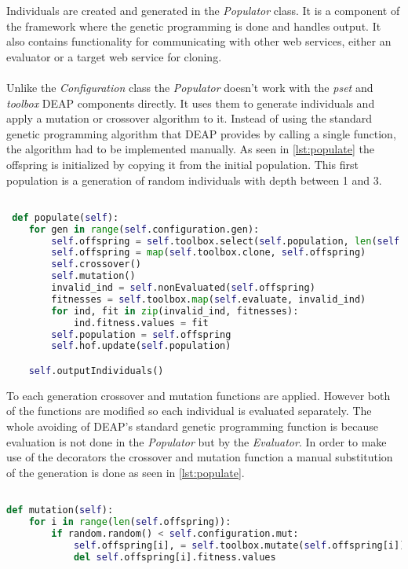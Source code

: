 Individuals are created and generated in the \textit{Populator} class. It is a component of the framework where
the genetic programming is done and handles output. It also contains functionality for communicating with other
web services, either an evaluator or a target web service for cloning.
\paragraph{}
Unlike the \textit{Configuration} class the \textit{Populator} doesn't work with the \textit{pset} and \textit{toolbox} DEAP
components directly. It uses them to generate individuals and apply a mutation or crossover algorithm to it. Instead of using
the standard genetic programming algorithm that DEAP provides by calling a single function, the algorithm had to be implemented 
manually. As seen in \ref{lst:populate} the offspring is initialized by copying it from the initial population. This first population is a
generation of random individuals with depth between 1 and 3. 

\begin{lstlisting}[language=Python,caption={Populate function responsible for generating individuals},label={lst:populate},breaklines=true]

 def populate(self):
    for gen in range(self.configuration.gen):
        self.offspring = self.toolbox.select(self.population, len(self.population))
        self.offspring = map(self.toolbox.clone, self.offspring)
        self.crossover()
        self.mutation()
        invalid_ind = self.nonEvaluated(self.offspring)
        fitnesses = self.toolbox.map(self.evaluate, invalid_ind)
        for ind, fit in zip(invalid_ind, fitnesses):
            ind.fitness.values = fit
        self.population = self.offspring
        self.hof.update(self.population)

    self.outputIndividuals()
\end{lstlisting}

To each generation crossover and mutation functions are applied. However both of the functions are modified so each
individual is evaluated separately. The whole avoiding of DEAP's standard genetic programming function is because evaluation
is not done in the \textit{Populator} but by the \textit{Evaluator}. In order to make use of the decorators the crossover
and mutation function a manual substitution of the generation is done as seen in \ref{lst:populate}.

\begin{lstlisting}[language=Python,caption={Modified mutation method to substitute each parent with its children},label={lst:populate}]

def mutation(self):
    for i in range(len(self.offspring)):
        if random.random() < self.configuration.mut:
            self.offspring[i], = self.toolbox.mutate(self.offspring[i])
            del self.offspring[i].fitness.values
\end{lstlisting}